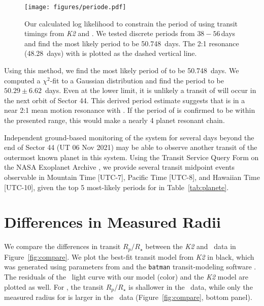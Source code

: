 \documentclass[twocolumn]{aastex631}
\begin{document}
\begin{figure}[!ht]
\begin{center}
\texttt{[image: figures/periode.pdf]}
\caption{Our calculated log likelihood to constrain the period of \planete using transit timings from \textit{K2} and \tess. We tested discrete periods from $38-56$\,days and find the most likely period to be 50.748~days. The 2:1 resonance (48.28~days) with \planetb is plotted as the dashed vertical line.} \label{fig:period_e}
\end{center}
\end{figure}

Using this method, we find the most likely period of \planete to be 50.748~days. We computed a $\chi^2$-fit to a Gaussian distribution and find the period to be $50.29 \pm 6.62$~days. Even at the lower limit, it is unlikely a transit of \planete will occur in the next orbit of Sector 44. This derived period estimate suggests that \planete is in a near 2:1 mean motion resonance with \planetb. If the period of \planete is confirmed to be within the presented range, this would make \allplanets a nearly 4 planet resonant chain.

Independent ground-based monitoring of the system for several days beyond the end of Sector 44 (UT 06 Nov 2021) may be able to observe another transit of the outermost known planet in this system. Using the Transit Service Query Form on the NASA Exoplanet Archive \citep{Akeson2013}, we provide several transit midpoint events observable in Mountain Time [UTC-7], Pacific Time [UTC-8], and Hawaiian Time [UTC-10], given the top 5 most-likely periods for \planete in Table~\ref{tab:planete}.

\section{Differences in Measured Radii} \label{sec:radii}

We compare the differences in transit $R_p/R_\star$ between the \textit{K2} and \tess\ data in Figure~\ref{fig:compare}. We plot the best-fit transit model from \textit{K2} in black, which was generated using parameters from \cite{David2019a} and the \texttt{batman} transit-modeling software \citep{Kreidberg15}. The residuals of the \tess\ light curve with our model (color) and the \textit{K2} model are plotted as well. For \planetknown, the transit $R_p/R_\star$ is shallower in the \tess\ data, while only the measured radius for \planete is larger in the \tess\ data (Figure~\ref{fig:compare}, bottom panel).
\end{document}

